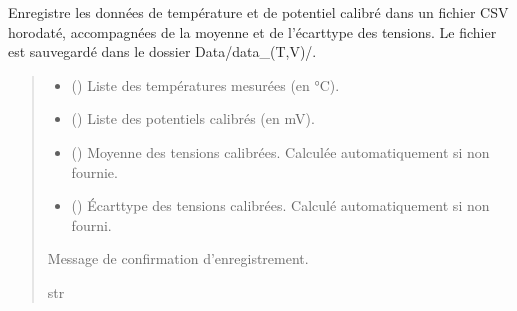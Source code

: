 \documentclass[letterpaper,10pt,english]{sphinxmanual}
\begin{document}

\begin{fulllineitems}
\label{\detokenize{Mesure:Mesure.enregistrement_csv}}
\pysigstartsignatures
\pysiglinewithargsret
{}
{\sphinxparamcomma {}\sphinxparamcomma {}\sphinxparamcomma {}}
{}
\pysigstopsignatures
\sphinxAtStartPar

Enregistre les données de température et de potentiel calibré dans un fichier
CSV horodaté, accompagnées de la moyenne et de l’écart\sphinxhyphen{}type des tensions.
Le fichier est sauvegardé dans le dossier Data/data\_(T,V)/.
\begin{quote}\begin{description}
\begin{itemize}
\item {} 
\sphinxAtStartPar
{} (\sphinxstyleliteralemphasis{\sphinxupquote{{[}}}\sphinxstyleliteralemphasis{\sphinxupquote{{]}}}) \textendash{} Liste des températures mesurées (en °C).

\item {} 
\sphinxAtStartPar
{} (\sphinxstyleliteralemphasis{\sphinxupquote{{[}}}\sphinxstyleliteralemphasis{\sphinxupquote{{]}}}) \textendash{} Liste des potentiels calibrés (en mV).

\item {} 
\sphinxAtStartPar
{} (\sphinxstyleliteralemphasis{\sphinxupquote{, }}) \textendash{} Moyenne des tensions calibrées. Calculée automatiquement
si non fournie.

\item {} 
\sphinxAtStartPar
{} (\sphinxstyleliteralemphasis{\sphinxupquote{, }}) \textendash{} Écart\sphinxhyphen{}type des tensions calibrées. Calculé
automatiquement si non fourni.

\end{itemize}

\sphinxAtStartPar
Message de confirmation d’enregistrement.

\sphinxAtStartPar
str

\end{description}\end{quote}

\end{fulllineitems}
\end{document}
